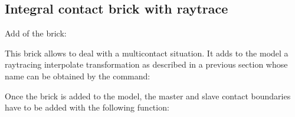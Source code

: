\documentclass[a4paper,11pt,english]{sphinxmanual}
\begin{document}
\subsection{Integral contact brick with raytrace}
\label{\detokenize{userdoc/model_contact_friction_large_sliding:integral-contact-brick-with-raytrace}}\label{\detokenize{userdoc/model_contact_friction_large_sliding:ud-model-contact-friction-large-hlgav}}
Add of the brick:

\begin{sphinxVerbatim}[commandchars=\\\{\}]
  
      
    
       
       
\end{sphinxVerbatim}

This brick allows to deal with a multi\sphinxhyphen{}contact situation. It adds to the model a raytracing interpolate transformation as described in a previous section whose name can be obtained by the command:

\begin{sphinxVerbatim}[commandchars=\\\{\}]
   
                        
\end{sphinxVerbatim}

Once the brick is added to the model, the master and slave contact boundaries have to be added with the following function:
\end{document}
